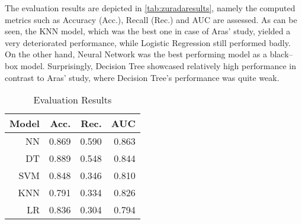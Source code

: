 The evaluation results are depicted in \autoref{tab:zuradaresults}, namely the computed metrics such as Accuracy (Acc.), Recall (Rec.) and AUC are assessed.
As can be seen, the KNN model, which was the best one in case of Aras' study, yielded a very deteriorated performance, while Logistic Regression still performed badly.
On the other hand, Neural Network was the best performing model as a black--box model. Surprisingly, Decision Tree showcased relatively high performance in contrast to Aras' study, where Decision Tree's performance was quite weak.
\begin{table}[H]
    \small
    \setlength{\tabcolsep}{8pt}
    \renewcommand{\arraystretch}{1.3}
    \centering
    \caption[Evaluation Results \citep{zurada2014classification}]{Evaluation Results \citep{zurada2014classification}}\label{tab:zuradaresults}
    \begin{tabular}{r r r r}
    \toprule
    \textbf{Model} & \textbf{Acc.} & \textbf{Rec.} & \textbf{AUC}\\
    \midrule
    \hline
    NN & 0.869 & 0.590 & 0.863 \\
    DT & 0.889 & 0.548 & 0.844 \\
    SVM & 0.848 & 0.346 & 0.810 \\
    KNN & 0.791 & 0.334 & 0.826 \\
    LR & 0.836 & 0.304 & 0.794 \\
    \hline
    \bottomrule
    \end{tabular}
    \vspace{0.35em}
    
    \vspace{-1em}
\end{table}

